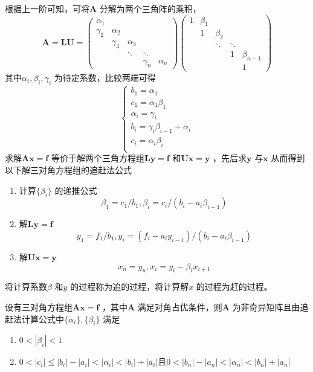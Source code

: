 \documentclass[a4paper]{article}
\begin{document}
根据上一阶可知，可将$\mathbf{A}$ 分解为两个三角阵的乘积，
\[
\mathbf{A} = \mathbf{LU} = \begin{pmatrix} 
	\alpha_1 & & & & \\
	\gamma_2 & \alpha_2 & & & \\
		 & \gamma_3 & \alpha_3 & & \\
		 & & \ddots & \ddots & \\
		 & & & \gamma_n & \alpha_n
\end{pmatrix} 
\begin{pmatrix} 
	1 & \beta_1 & & & \\
	  & 1 & \beta_2 & & \\
	  & & \ddots & \ddots & \\
	  & & & 1 & \beta_{n-1} \\
	  & & & & 1
\end{pmatrix} 
\] 
其中$\alpha_i, \beta_i, \gamma_i$ 为待定系数，比较两端可得
\[
	\tag{6.4.6} \label{eq:6.4.6} 
\begin{cases}
	b_1  = \alpha_1 \\
	c_1 = \alpha_1 \beta_1 \\
	\alpha_i = \gamma_i \\
	b_i = \gamma_i \beta_{i-1} + \alpha_i \\
	c_i = \alpha_i \beta_i \\
\end{cases} 
\] 
求解$\mathbf{Ax} = \mathbf{f}$ 等价于解两个三角方程组$\mathbf{Ly} = \mathbf{f}$ 和$\mathbf{Ux} = \mathbf{y}$ ，先后求$\mathbf{y}$ 与$\mathbf{x}$ 从而得到以下解三对角方程组的追赶法公式
\begin{enumerate}
	\item 计算$\{ \beta_i \} $ 的递推公式
		\[
			\beta_1 = c_1 / b_1, \beta_i = c_i / (b_i - a_i \beta_{i-1})
		\] 
	\item 解$ \mathbf{Ly} = \mathbf{f}$
		\[
			y_1 = f_1 / b_1, y_i = (f_i - a_i y_{i-1}) / (b_i - a_i \beta_{i-1})
		\] 
	\item 解$\mathbf{Ux} = \mathbf{y}$
		\[
		x_{n} = y_{n}, x_i = y_i - \beta_i x_{i+1}
		\] 
\end{enumerate}

将计算系数$\beta$ 和$y$ 的过程称为追的过程，将计算解$x$ 的过程为赶的过程。

\begin{theorem}
	设有三对角方程组$\mathbf{Ax} = \mathbf{f}$ ，其中$\mathbf{A}$ 满足对角占优条件，则$\mathbf{A}$ 为非奇异矩阵且由追赶法计算公式中$\{\alpha_i\}, \{\beta_i\}$ 满足
	\begin{enumerate}
		\item $0 < | \beta_i | < 1$
		\item $0 < | c_i | \le | b_i | - | a_i | < | \alpha_i | < | b_i | + | a_i |$且$0 < | b_n | - | a_n | < | \alpha_n | < | b_n | + | a_n |$
	\end{enumerate}
\end{theorem}
\end{document}
